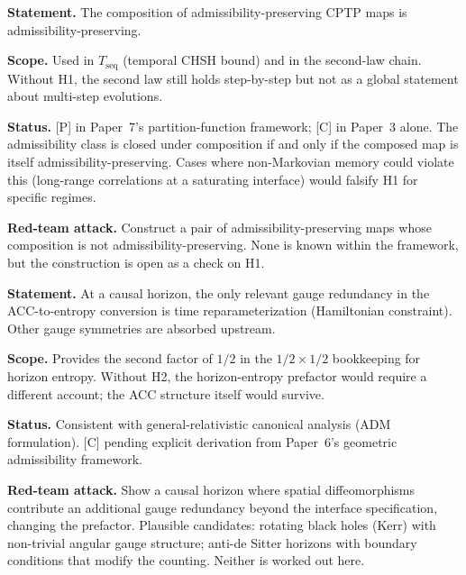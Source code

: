 \documentclass[11pt]{article}
\theoremstyle{remark}
\begin{document}
\begin{tcolorbox}[redteambox, title={H1 --- Markovian-composition closure (\S\ref{sec:TCPTP})}]
\textbf{Statement.}  The composition of admissibility-preserving CPTP maps
is admissibility-preserving.

\textbf{Scope.}  Used in $T_{\mathrm{seq}}$ (temporal CHSH bound) and in the
second-law chain.  Without H1, the second law still holds step-by-step but
not as a global statement about multi-step evolutions.

\textbf{Status.}  [P] in Paper~7's partition-function framework; [C] in
Paper~3 alone.  The admissibility class is closed under composition if
and only if the composed map is itself admissibility-preserving.  Cases
where non-Markovian memory could violate this (long-range correlations at
a saturating interface) would falsify H1 for specific regimes.

\textbf{Red-team attack.}  Construct a pair of admissibility-preserving
maps whose composition is not admissibility-preserving.  None is known
within the framework, but the construction is open as a check on H1.
\end{tcolorbox}

\begin{tcolorbox}[redteambox, title={H2 --- Hamiltonian-constraint redundancy (\S\ref{sec:ACC})}]
\textbf{Statement.}  At a causal horizon, the only relevant gauge
redundancy in the ACC-to-entropy conversion is time reparameterization
(Hamiltonian constraint).  Other gauge symmetries are absorbed upstream.

\textbf{Scope.}  Provides the second factor of $1/2$ in the $1/2 \times 1/2$
bookkeeping for horizon entropy.  Without H2, the horizon-entropy
prefactor would require a different account; the ACC structure itself
would survive.

\textbf{Status.}  Consistent with general-relativistic canonical analysis
(ADM formulation).  [C] pending explicit derivation from Paper~6's
geometric admissibility framework.

\textbf{Red-team attack.}  Show a causal horizon where spatial
diffeomorphisms contribute an additional gauge redundancy beyond the
interface specification, changing the prefactor.  Plausible candidates:
rotating black holes (Kerr) with non-trivial angular gauge structure;
anti-de Sitter horizons with boundary conditions that modify the
counting.  Neither is worked out here.
\end{tcolorbox}
\end{document}
